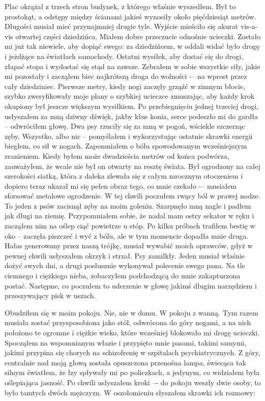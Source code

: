 Plac okrążał z trzech stron budynek, z którego właśnie wyszedłem. Był to prostokąt, a odstępy między ścianami jakieś wynosiły około pięćdziesiąt metrów.  Długości musiał mieć przynajmniej drugie tyle. Wyjście mieściło się akurat vis-a-vis otwartej części dziedzińca. Miałem dobre przeczucie odnośnie ucieczki. Zostało mi już tak niewiele, aby dopiąć swego: za dziedzińcem, w oddali widać było drogę i jeżdżące na światłach samochody. Ostatni wysiłek, aby dostać się do drogi, złapać stopa i wydostać się stąd na zawsze. Zebrałem w sobie wszystkie siły, jakie mi pozostały i zacząłem biec najkrótszą droga do wolności -– na wprost przez cały dziedziniec. Pierwsze metry, kiedy nogi zaczęły grząźć w zimnym błocie, szybko zweryfikowały moje plany o szybkiej ucieczce zmuszając, aby każdy krok okupiony był jeszcze większym wysiłkiem. Po przebiegnięciu jednej trzeciej drogi, usłyszałem za mną dziwny dźwięk, jakby kłus konia, serce podeszło mi do gardła -- odwróciłem głowę. Dwa psy rzuciły się za mną w pogoń, wściekle szczerząc zęby. Wszystko, albo nic -- pomyślałem i wykorzystując ostatnie skrawki energii biegłem, co sił w nogach. Zapomniałem o bólu spowodowanym wcześniejszym zranieniem. Kiedy byłem może dwadzieścia metrów od końca podwórza, zauważyłem, że wcale nie był on otwarty na resztę świata. Był ogrodzony na całej szerokości siatką, która z daleka zlewała się z całym mrocznym otoczeniem i dopiero teraz ukazał mi się pełen obraz tego, co mnie czekało -– musiałem sforsować metalowe ogrodzenie. W tej chwili poczułem rwący ból w prawej nodze. To jeden z psów zacisnął zęby na moim goleniu. Szarpnęło mną nagle i padłem jak długi na ziemię. Przypomniałem sobie, że nadal mam ostry sekator w ręku i zacząłem nim na oślep ciąć powietrze u stóp. Po kilku próbach trafiłem bestię w oko – zaczęła piszczeć i wyć z bólu, ale w tym momencie dopadła mnie druga. Hałas generowany przez naszą trójkę, musiał wywabić moich oprawców, gdyż w pewnej chwili usłyszałem okrzyk i strzał. Psy zamilkły. Jeden musiał właśnie dożyć swych dni, a drugi posłusznie wykonywał polecenie swego pana. Na tle ciemnego i ciężkiego nieba, zobaczyłem podchodzącą do mnie zakapturzona postać. Następne, co poczułem to uderzenie w głowę jakimś długim narzędziem i przeszywający pisk w uszach.

Obudziłem się w moim pokoju. Nie, nie w domu. W pokoju z wanną. Tym razem musiała zostać przysposobiona jako stół, odwrócona do góry nogami, a na nich położono te ogromne i ciężkie wieko, które wcześniej blokowało mi drogę ucieczki. Spocząłem na wspomnianym włazie i przypięto mnie pasami, takimi samymi, jakimi przypina się chorych na schizofrenię w szpitalach psychiatrycznych. Z góry, centralnie nad moją głową została opuszczona przenośna lampa, świecąca tak silnym światłem, że łzy spływały mi po policzkach, a jedynym, co widziałem była oślepiająca jasność. Po chwili usłyszałem kroki –- do pokoju weszły dwie osoby, to było tamtych dwóch mężczyzn. W oszołomieniu słyszałem skrawki ich rozmowy: 

